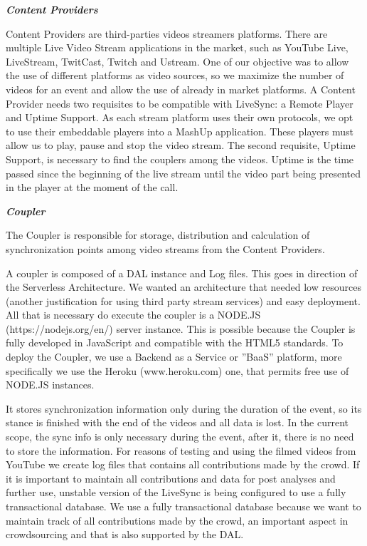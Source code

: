 \documentclass[sigconf]{acmart}
\begin{document}
\textbf{\textit{Content Providers}}

Content Providers are third-parties videos streamers platforms. There are multiple Live Video Stream applications in the market, such as YouTube Live, LiveStream, TwitCast, Twitch and Ustream. One of our objective was to allow the use of different platforms as video sources, so we maximize the number of videos for an event and allow the use of already in market platforms. A Content Provider needs two requisites to be compatible with LiveSync: a Remote Player and Uptime Support. As each stream platform uses their own protocols, we opt to use their embeddable players into a MashUp application. These players must allow us to play, pause and stop the video stream. The second requisite, Uptime Support, is necessary to find the couplers among the videos. Uptime is the time passed since the beginning of the live stream until the video part being presented in the player at the moment of the call.

\textbf{\textit{Coupler}}

The Coupler is responsible for storage, distribution and calculation of synchronization points among video streams from the Content Providers.

A coupler is composed of a DAL instance and Log files. This goes in direction of the Serverless Architecture. We wanted an architecture that needed low resources (another justification for using third party stream services) and easy deployment. All that is necessary do execute the coupler is a NODE.JS (https://nodejs.org/en/) server instance. This is possible because the Coupler is fully developed in JavaScript and compatible with the HTML5 standards. To deploy the Coupler, we use a Backend as a Service or ”BaaS” platform, more specifically we use the Heroku (www.heroku.com) one, that permits free use of NODE.JS instances.

It stores synchronization information only during the duration of the event, so its stance is finished with the end of the videos and all data is lost. In the current scope, the sync info is only necessary during the event, after it, there is no need to store the information. For reasons of testing and using the filmed videos from YouTube we create log files that contains all contributions made by the crowd. If it is important to maintain all contributions and data for post analyses and further use, unstable version of the LiveSync is being configured to use a fully transactional database. We use a fully transactional database because we want to maintain track of all contributions made by the crowd, an important aspect in crowdsourcing and that is also supported by the DAL.
\end{document}
